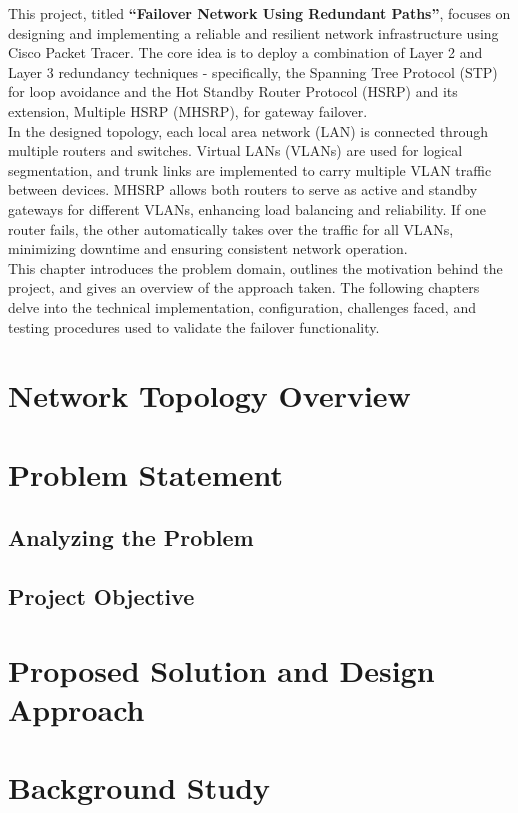 \documentclass[12pt]{report}
\begin{document}
This project, titled \textbf{“Failover Network Using Redundant Paths”}, focuses on designing and implementing a reliable and resilient network infrastructure using Cisco Packet Tracer. The core idea is to deploy a combination of Layer 2 and Layer 3 redundancy techniques - specifically, the Spanning Tree Protocol (STP) for loop avoidance and the Hot Standby Router Protocol (HSRP) and its extension, Multiple HSRP (MHSRP), for gateway failover.\\

In the designed topology, each local area network (LAN) is connected through multiple routers and switches. Virtual LANs (VLANs) are used for logical segmentation, and trunk links are implemented to carry multiple VLAN traffic between devices. MHSRP allows both routers to serve as active and standby gateways for different VLANs, enhancing load balancing and reliability. If one router fails, the other automatically takes over the traffic for all VLANs, minimizing downtime and ensuring consistent network operation.\\

This chapter introduces the problem domain, outlines the motivation behind the project, and gives an overview of the approach taken. The following chapters delve into the technical implementation, configuration, challenges faced, and testing procedures used to validate the failover functionality.

\newpage

\chapter{Network Topology Overview}
\chapter{Problem Statement}
\section{Analyzing the Problem}
\section{Project Objective}
\chapter{Proposed Solution and Design Approach}
\chapter{Background Study}
\end{document}
